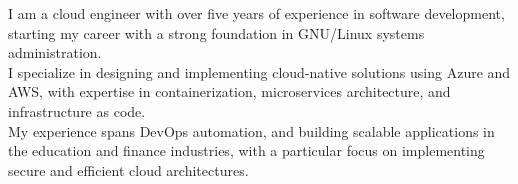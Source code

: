\vspace{0.2cm}


\begin{minipage}[t]{1\textwidth}
    \vspace{-\baselineskip}
    I am a cloud engineer with over five years of experience in software development, starting my career with a strong foundation in GNU/Linux systems administration. \\
    I specialize in designing and implementing cloud-native solutions using Azure and AWS, with expertise in containerization, microservices architecture, and infrastructure as code. \\
    My experience spans DevOps automation, and building scalable applications in the education and finance industries, with a particular focus on implementing secure and efficient cloud architectures.
\end{minipage}
